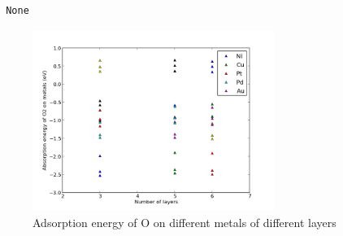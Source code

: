 \documentclass[11pt]{article}
\begin{document}
\begin{verbatim}
 None
\end{verbatim}
\begin{figure}[H]
\centering
\includegraphics[width=0.7\textwidth]{./images/result.png}
\caption{Adsorption energy of O on different metals of different layers}
\end{figure}
\end{document}
